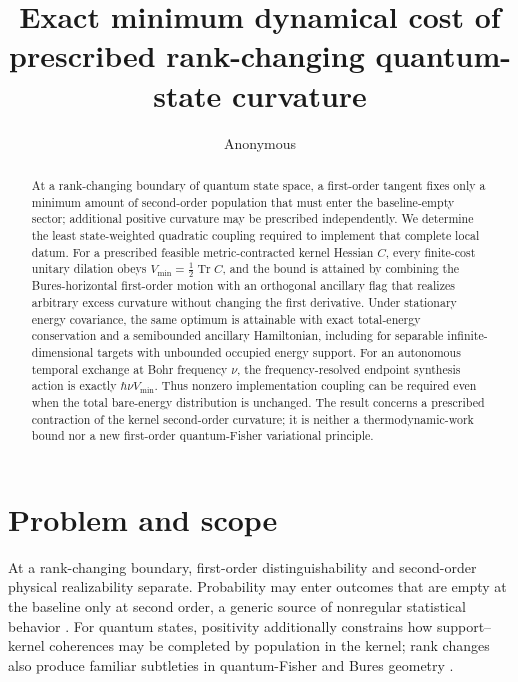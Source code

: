 \documentclass[aps,pra,preprint,nofootinbib]{revtex4-2}
\begin{document}
\title{Exact minimum dynamical cost of prescribed rank-changing quantum-state curvature}
\author{Anonymous}

\begin{abstract}
At a rank-changing boundary of quantum state space, a first-order tangent fixes only a minimum amount of second-order population that must enter the baseline-empty sector; additional positive curvature may be prescribed independently. We determine the least state-weighted quadratic coupling required to implement that complete local datum. For a prescribed feasible metric-contracted kernel Hessian $C$, every finite-cost unitary dilation obeys $V_{\min}=\tfrac12\operatorname{Tr}C$, and the bound is attained by combining the Bures-horizontal first-order motion with an orthogonal ancillary flag that realizes arbitrary excess curvature without changing the first derivative. Under stationary energy covariance, the same optimum is attainable with exact total-energy conservation and a semibounded ancillary Hamiltonian, including for separable infinite-dimensional targets with unbounded occupied energy support. For an autonomous temporal exchange at Bohr frequency $\nu$, the frequency-resolved endpoint synthesis action is exactly $\hbar\nu V_{\min}$. Thus nonzero implementation coupling can be required even when the total bare-energy distribution is unchanged. The result concerns a prescribed contraction of the kernel second-order curvature; it is neither a thermodynamic-work bound nor a new first-order quantum-Fisher variational principle.
\end{abstract}

\maketitle

\section{Problem and scope}

At a rank-changing boundary, first-order distinguishability and second-order physical realizability separate. Probability may enter outcomes that are empty at the baseline only at second order, a generic source of nonregular statistical behavior \cite{Chernoff1954,Shapiro1985,SelfLiang1987}. For quantum states, positivity additionally constrains how support--kernel coherences may be completed by population in the kernel; rank changes also produce familiar subtleties in quantum-Fisher and Bures geometry \cite{Safranek2017}.
\end{document}
